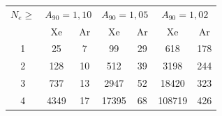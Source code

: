 \begin{tabular}{@{}ccccccc@{}}
\toprule
$N_e\ge$ & \multicolumn{2}{c}{$A_{90}=1{,}10$} & \multicolumn{2}{c}{$A_{90}=1{,}05$} & \multicolumn{2}{c}{$A_{90}=1{,}02$} \\
 & Xe & Ar & Xe & Ar & Xe & Ar \\
\midrule
1 & 25 & 7 & 99 & 29 & 618 & 178 \\
2 & 128 & 10 & 512 & 39 & 3198 & 244 \\
3 & 737 & 13 & 2947 & 52 & 18420 & 323 \\
4 & 4349 & 17 & 17395 & 68 & 108719 & 426 \\
\bottomrule
\end{tabular}
